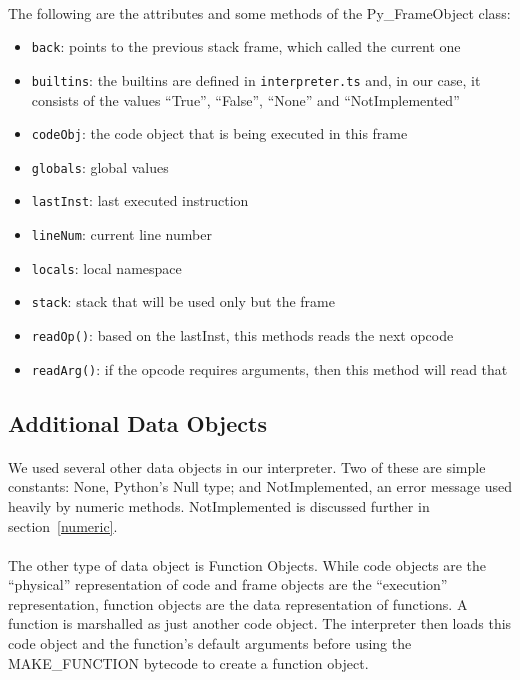 \documentclass{article}
\begin{document}
\paragraph{}
The following are the attributes and some methods of the Py\_FrameObject class:

\begin{itemize}
	\item \texttt{back}: points to the previous stack frame, which called the current one
	\item \texttt{builtins}: the builtins are defined in \texttt{interpreter.ts} and, in our case, it consists of the values ``True'', ``False'', ``None'' and ``NotImplemented''
	\item \texttt{codeObj}: the code object that is being executed in this frame
	\item \texttt{globals}: global values
	\item \texttt{lastInst}: last executed instruction
	\item \texttt{lineNum}: current line number
	\item \texttt{locals}: local namespace
	\item \texttt{stack}: stack that will be used only but the frame
	\item \texttt{readOp()}: based on the lastInst, this methods reads the next opcode
	\item \texttt{readArg()}: if the opcode requires arguments, then this method will read that	
\end{itemize}


\subsection{Additional Data Objects}

\paragraph{}
We used several other data objects in our interpreter. Two of these are simple constants: None, Python's Null type; and NotImplemented, an error message used heavily by numeric methods. NotImplemented is discussed further in section~\ref{numeric}.

\paragraph{}
The other type of data object is Function Objects. While code objects are the ``physical'' representation of code and frame objects are the ``execution'' representation, function objects are the data representation of functions. A function is marshalled as just another code object. The interpreter then loads this code object and the function's default arguments before using the MAKE\_FUNCTION bytecode to create a function object.
\end{document}
